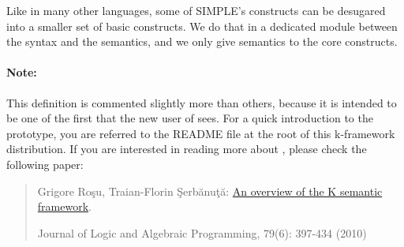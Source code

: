 \begin{kblock}[text]
\begin{itemize}
\end{itemize}
Like in many other languages, some of SIMPLE's constructs can be
desugared into a smaller set of basic constructs.  We do that in a 
dedicated module between the syntax and the semantics, and we only
give semantics to the core constructs.

\paragraph{Note:}{
This definition is commented slightly more than others, because it is
intended to be one of the first that the new user of \K sees.
For a quick introduction to the \K prototype, you are referred to
the README file at the root of this k-framework distribution.  If you are
interested in reading more about \K, please check the following paper:
\begin{quote}
Grigore Ro\c su, Traian-Florin \c Serb\u anu\c t\u a:
\href{http://dx.doi.org/10.1016/j.jlap.2010.03.012}{An overview of the K semantic framework}.

Journal of Logic and Algebraic Programming, 79(6): 397-434 (2010)
\end{quote}
}
\end{kblock}

\vspace*{3ex}
